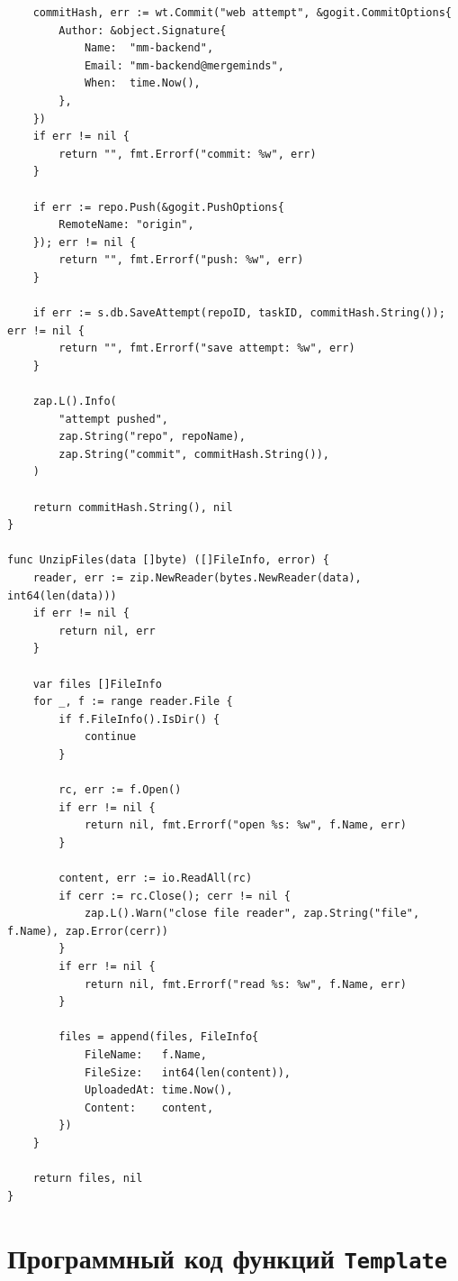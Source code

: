 \documentclass[coursework]{SCWorks}
\begin{document}
\begin{verbatim}
	commitHash, err := wt.Commit("web attempt", &gogit.CommitOptions{
		Author: &object.Signature{
			Name:  "mm-backend",
			Email: "mm-backend@mergeminds",
			When:  time.Now(),
		},
	})
	if err != nil {
		return "", fmt.Errorf("commit: %w", err)
	}

	if err := repo.Push(&gogit.PushOptions{
		RemoteName: "origin",
	}); err != nil {
		return "", fmt.Errorf("push: %w", err)
	}

	if err := s.db.SaveAttempt(repoID, taskID, commitHash.String()); err != nil {
		return "", fmt.Errorf("save attempt: %w", err)
	}

	zap.L().Info(
		"attempt pushed",
		zap.String("repo", repoName),
		zap.String("commit", commitHash.String()),
	)

	return commitHash.String(), nil
}

func UnzipFiles(data []byte) ([]FileInfo, error) {
	reader, err := zip.NewReader(bytes.NewReader(data), int64(len(data)))
	if err != nil {
		return nil, err
	}

	var files []FileInfo
	for _, f := range reader.File {
		if f.FileInfo().IsDir() {
			continue
		}

		rc, err := f.Open()
		if err != nil {
			return nil, fmt.Errorf("open %s: %w", f.Name, err)
		}

		content, err := io.ReadAll(rc)
		if cerr := rc.Close(); cerr != nil {
			zap.L().Warn("close file reader", zap.String("file", f.Name), zap.Error(cerr))
		}
		if err != nil {
			return nil, fmt.Errorf("read %s: %w", f.Name, err)
		}

		files = append(files, FileInfo{
			FileName:   f.Name,
			FileSize:   int64(len(content)),
			UploadedAt: time.Now(),
			Content:    content,
		})
	}

	return files, nil
}

\end{verbatim}

\section{Программный код функций \texttt{Template}}
\label{sec:template}
\end{document}
